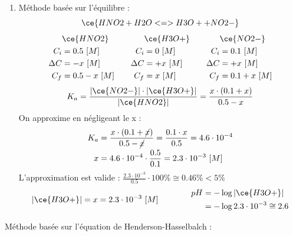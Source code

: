 \documentclass[
  11pt,
  a4paper,
  openany]{book}
\providecommand{\tightlist}{%
  \setlength{\itemsep}{0pt}\setlength{\parskip}{0pt}}
\begin{document}
\begin{Answer}

\begin{enumerate}
\def\labelenumi{\alph{enumi}.}
\tightlist
\item
  Méthode basée sur l'équilibre :
  \[
  \ce{HNO2 + H2O <=> H3O+ + NO2-}
  \]
  \[
  \begin{split}
  &\ce{HNO2}\\
  C_i &= 0.5\ [M] \\
  \Delta C &= - x\ [M] \\
  C_f &= 0.5 - x\ [M] \\
  \end{split}
  \qquad
  \begin{split}
  &\ce{H3O+}\\
  C_i &= 0\ [M] \\
  \Delta C &= + x\ [M] \\
  C_f &= x\ [M] \\
  \end{split}
  \qquad
  \begin{split}
  &\ce{NO2-}\\
  C_i &= 0.1\ [M] \\
  \Delta C &= + x\ [M] \\
  C_f &= 0.1 + x\ [M] \\
  \end{split}
  \]
  \[
  K_a = \frac{|\ce{NO2-}| \cdot |\ce{H3O+}|}{|\ce{HNO2}|} = \frac{x \cdot (0.1 + x)}{0.5 - x}
  \]
  On approxime en négligeant le x :
  \[
  \begin{split}
  K_a &= \frac{x \cdot (0.1 + \cancel{x})}{0.5 - \cancel{x}} = \frac{0.1 \cdot x}{0.5} = 4.6 \cdot 10^{-4} \\
  x &= 4.6 \cdot 10^{-4} \cdot \frac{0.5}{0.1} = 2.3 \cdot 10^{-3}\ [M]
  \end{split}
  \]
  L'approximation est valide : \(\frac{2.3 \cdot 10^{-3}}{0.5} \cdot 100\% \cong 0.46\% < 5\%\)
  \[
  \begin{split}
  |\ce{H3O+}| = x = 2.3 \cdot 10^{-3}\ [M]
  \end{split}
  \qquad\qquad
  \begin{split}
  pH &= - \log |\ce{H3O+}| \\
   &= - \log 2.3 \cdot 10^{-3} \cong 2.6
  \end{split}
  \]
\end{enumerate}

Méthode basée sur l'équation de Henderson-Hasselbalch :


\end{Answer}
\end{document}
